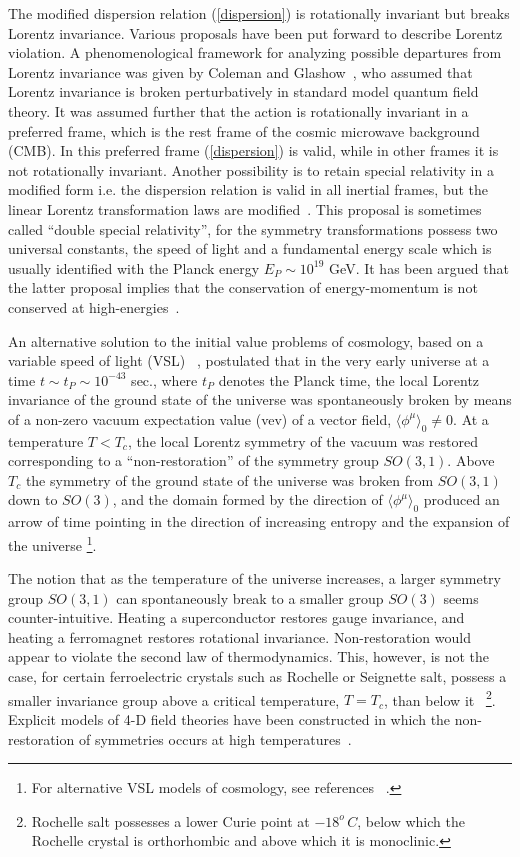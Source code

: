 \documentclass[a4paper,12pt]{article}
\begin{document}
The modified dispersion relation (\ref{dispersion}) is
rotationally invariant but breaks Lorentz invariance. Various proposals have been
put forward to describe Lorentz violation. A phenomenological framework for
analyzing possible departures from Lorentz invariance was given by Coleman and
Glashow~\cite{Glashow2}, who assumed that Lorentz invariance is broken
perturbatively in standard model quantum field theory. It was assumed further that
the action is rotationally invariant in a preferred frame, which is the rest frame
of the cosmic microwave background (CMB). In this preferred frame
(\ref{dispersion}) is valid, while in other frames it is not rotationally invariant.
Another possibility is to retain special relativity in a modified form i.e. the
dispersion relation is valid in all inertial frames, but the linear Lorentz
transformation laws are modified~\cite{Camelia2,Smolin}. This proposal is sometimes
called ``double special relativity'', for the symmetry transformations possess two
universal constants, the speed of light and a fundamental energy scale which is
usually identified with the Planck energy $E_P\sim 10^{19}$ GeV. It has been argued
that the latter proposal implies that the conservation of energy-momentum is not
conserved at high-energies~\cite{Toller}.

An alternative solution to the initial value
problems of cosmology, based on a variable speed of light (VSL)
~\cite{Moffat,Moffat2}, postulated that in the
very early universe at a time $t\sim t_P\sim 10^{-43}$ sec.,
where $t_P$ denotes the Planck time, the local Lorentz
invariance of the ground state of the universe was spontaneously
broken by means of a non-zero vacuum expectation value (vev) of a
vector field, $\langle\phi^\mu\rangle_0 \not=0$. At a temperature
$T < T_c$, the local Lorentz
symmetry of the vacuum was restored corresponding to a
``non-restoration'' of the symmetry group $SO(3,1)$.  Above
$T_c$ the symmetry of the ground state of the universe was
broken from $SO(3,1)$ down to $SO(3)$, and the domain formed by
the direction of $\langle\phi^\mu\rangle_0$ produced an arrow of
time pointing in the direction of increasing entropy and the
expansion of the universe \footnote{For alternative VSL models of cosmology, see
references ~\cite{Clayton,Clayton2,Magueijo}.}.

The notion that as the temperature of the universe increases, a larger
symmetry group $SO(3,1)$ can spontaneously break to a smaller group $SO(3)$
seems counter-intuitive. Heating a superconductor restores gauge
invariance, and heating a ferromagnet restores rotational invariance.
Non-restoration would appear to violate the second law of
thermodynamics. This, however, is not the case, for certain
ferroelectric crystals such as Rochelle or Seignette salt,
possess a smaller invariance group above a critical temperature,
$T=T_c$, than below it~\cite{Jona} \footnote{Rochelle salt
possesses a lower Curie point at $-18^o\,C$, below which the
Rochelle crystal is orthorhombic and above which it is
monoclinic.}. Explicit models of 4-D field theories have been
constructed in which the non-restoration of symmetries
occurs at high temperatures~\cite{Weinberg}.
\end{document}
